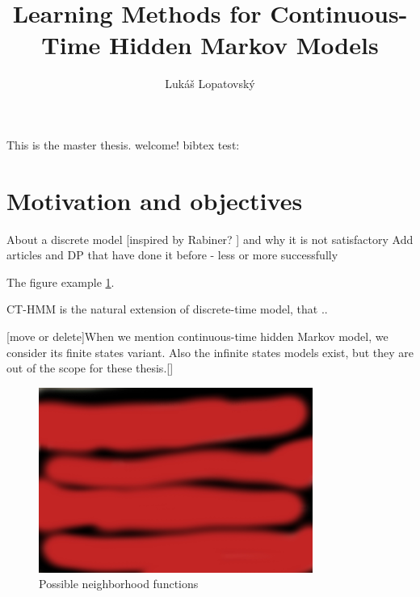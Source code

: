 \documentclass[thesis=M,english]{FITthesis}[2012/10/20]
\title{Learning Methods for Continuous-Time Hidden Markov Models}
\author{Luk{\' a}{\v s} Lopatovsk{\' y}} %
\begin{document}


\begin{introduction}
	This is the master thesis. welcome!
	bibtex test: \cite{Sk01}
	\section{Motivation and objectives}
	About a discrete model [inspired by Rabiner? ] and why it is not satisfactory  %
	Add articles and DP that have done it before - less or more successfully 
	
The figure example \ref{fig:gb}.

CT-HMM is the natural extension of discrete-time model, that ..

[move or delete]When we mention continuous-time hidden Markov model, we consider its finite states variant. Also the infinite states models exist, but they are out of the scope for these thesis.[]


\begin{figure}[h]
\centering
\includegraphics[width=0.8\textwidth]{img/ps.jpg}
\caption{Possible neighborhood functions \cite{Ho03} }
\label{fig:gb}
\end{figure} 	
	
	
\end{introduction}
\end{document}
